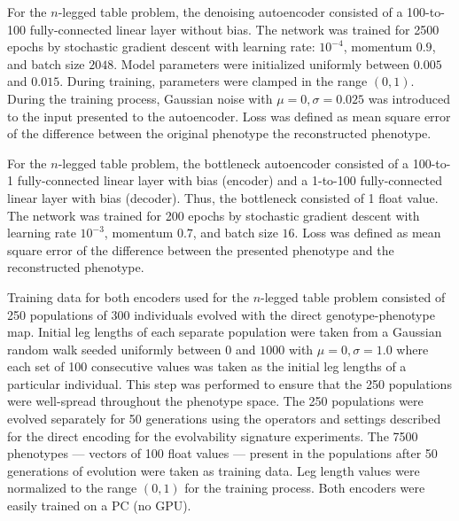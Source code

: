 For the $n$-legged table problem, the denoising autoencoder consisted of a 100-to-100 fully-connected linear layer without bias.
The network was trained for 2500 epochs by stochastic gradient descent with learning rate: $10^{-4}$, momentum $0.9$, and batch size $2048$.
Model parameters were initialized uniformly between $0.005$ and $0.015$.
During training, parameters were clamped in the range $(0,1)$.
During the training process, Gaussian noise with $\mu = 0, \sigma = 0.025$ was introduced to the input presented to the autoencoder.
Loss was defined as mean square error of the difference between the original phenotype the reconstructed phenotype.

For the $n$-legged table problem, the bottleneck autoencoder consisted of a 100-to-1 fully-connected linear layer with bias (encoder) and a 1-to-100 fully-connected linear layer with bias (decoder).
Thus, the bottleneck consisted of 1 float value.
The network was trained for 200 epochs by stochastic gradient descent with learning rate $10^{-3}$, momentum $0.7$, and batch size $16$.
Loss was defined as mean square error of the difference between the presented phenotype and the reconstructed phenotype.

Training data for both encoders used for the $n$-legged table problem consisted of 250 populations of 300 individuals evolved with the direct genotype-phenotype map.
Initial leg lengths of each separate population were taken from a Gaussian random walk seeded uniformly between $0$ and $1000$ with $\mu = 0, \sigma = 1.0$ where each set of 100 consecutive values was taken as the initial leg lengths of a particular individual.
This step was performed to ensure that the 250 populations were well-spread throughout the phenotype space.
The 250 populations were evolved separately for 50 generations using the operators and settings described for the direct encoding for the evolvability signature experiments.
The 7500 phenotypes --- vectors of 100 float values --- present in the populations after 50 generations of evolution were taken as training data.
Leg length values were normalized to the range $(0,1)$ for the training process.
Both encoders were easily trained on a PC (no GPU).

